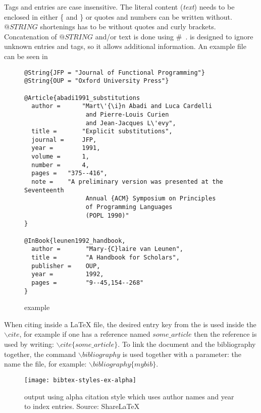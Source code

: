 Tags and entries are case insensitive. The literal content
(\emph{text}) needs to be enclosed in either \{ and \} or quotes and
numbers can be written without.  $@STRING$ shortenings has to be
without quotes and curly brackets.  Concatenation of $@STRING$ and/or
text is done using \#~\cite{bibtex_resource}.  {\bibtex} is designed
to ignore unknown entries and tags, so it allows additional
information.  An example {\bibtex} file can be seen in

\begin{figure}
  \centering
  \begin{small}
\begin{verbatim}
@String{JFP = "Journal of Functional Programming"}
@String{OUP = "Oxford University Press"}

@Article{abadi1991_substitutions
  author =      "Mart\'{\i}n Abadi and Luca Cardelli
                 and Pierre-Louis Curien
                 and Jean-Jacques L\'evy",
  title =       "Explicit substitutions",
  journal =     JFP,
  year =        1991,
  volume =      1,
  number =      4,
  pages =	"375--416",
  note =	"A preliminary version was presented at the Seventeenth
                 Annual {ACM} Symposium on Principles
                 of Programming Languages
                 (POPL 1990)"
}

@InBook{leunen1992_handbook,
  author =       "Mary-{C}laire van Leunen",
  title =        "A Handbook for Scholars",
  publisher =    OUP,
  year =         1992,
  pages =        "9--45,154--268"
}
\end{verbatim}
  \end{small}
  \caption{{\bibtex} example}
\label{fig:bibtex_example}
\end{figure}

When citing inside a {\LaTeX} file, the desired entry key from the
{\bibtex} is used inside the ${\backslash}cite$, for example if one
has a reference named $some\_article$ then the reference is used by
writing: ${\backslash}cite\{some\_article\}$.  To link the document
and the bibliography together, the command ${\backslash}bibliography$
is used together with a parameter: the name the {\bibtex} file, for
example: ${\backslash}bibliography\{mybib\}$.

\begin{figure}
  \centering
  \texttt{[image: bibtex-styles-ex-alpha]}
  \caption{{\bibtex} output using alpha citation style which uses
    author names and year to index entries.  Source:
    ShareLaTeX~\cite{sharelatex2016_styles}}
\label{fig:bibtex_example_alpha}
\end{figure}


